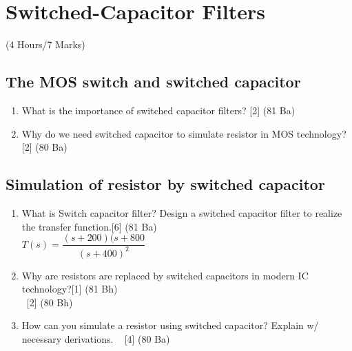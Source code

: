 \documentclass[12pt]{article}
\newcommand{\enter}{\\\textcolor{white}{1}}
\begin{document}
\pagebreak
\section{Switched-Capacitor Filters}
\begin{center}(4 Hours/7 Marks)\end{center}
\subsection{The MOS switch and switched capacitor}
\begin{enumerate}
	\item What is the importance of switched capacitor filters? \hfill [2] (81 Ba)

\item Why do we need switched capacitor to simulate resistor in MOS technology?\hfill[2] (80 Ba)
\end{enumerate}
\subsection{Simulation of resistor by switched capacitor}
\begin{enumerate}
\item What is Switch capacitor filter? Design a switched capacitor filter to realize the transfer function.\hfill [6] (81 Ba)\\
$T(s) = \dfrac{(s+200)(s+800}{(s+400)^2}$
\item Why are resistors are replaced by switched capacitors in modern IC technology?\hfill[1] (81 Bh)
\enter\hfill [2] (80 Bh)
\item How can you simulate a resistor using switched capacitor? Explain w/ necessary derivations.
\textcolor{white}{1} \hfill[4] (80 Ba)

\end{enumerate}
\end{document}
